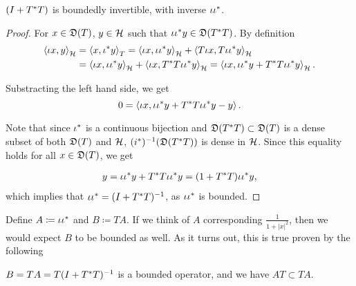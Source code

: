 \begin{prop}
 $(I + T ^{*} T)$ is boundedly
 invertible, with inverse $\iota \iota ^{*}$.
\end{prop}
\begin{proof}
  For $x \in \mathfrak{D}(T)$, $y \in \mathcal{H}$ such that 
  $\iota  \iota ^{*} y \in \mathfrak{D}(T^{*} T)$.
  By definition 
  \begin{align*}
\left\langle \iota x, y \right\rangle_{\mathcal{H}} &= \left\langle x, \iota ^{*} y \right\rangle_T = 
  \left\langle \iota x,\iota \iota ^{*} y \right\rangle_{\mathcal{H}} +
  \left\langle  T \iota x, T \iota \iota ^{*} y \right\rangle_{\mathcal{H}} \\
  &=\left\langle \iota x, \iota \iota ^{*} y \right\rangle_{\mathcal{H}}  +
  \left\langle \iota x , T ^{*} T \iota \iota ^{*} y \right\rangle_{\mathcal{H}}  =
  \left\langle \iota x, \iota \iota ^{*} y + T^{*} T \iota \iota ^{*} y \right\rangle_{\mathcal{H}} .
  \end{align*}
  
  Substracting the left hand side, we get
  \[
   0 = \left\langle \iota x , \iota \iota ^{*} y + T^{*} T \iota \iota ^{*} y - y \right\rangle.
  \]

  
  Note that since $\iota ^{*}$ is a continuous bijection and $\mathfrak{D}(T ^{*} T)
  \subset \mathfrak{D}(T)$ is a
  dense subset of both $\mathfrak{D}(T)$ and $\mathcal{H}$, $(i ^{*}) ^{-1} (\mathfrak{D}(T ^{*} T))$ is dense
  in $\mathcal{H}$. Since this equality holds for all $x \in \mathfrak{D}(T)$, we get

  \begin{align*}
  y=\iota \iota ^{*} y + T^{*} T \iota \iota ^{*} y 
  = (1+ T ^{*} T) \iota \iota ^{*} y,
  \end{align*}
  which implies that $ \iota \iota ^{*} = ( I + T ^{*} T) ^{-1}$,
  as $\iota \iota^{*} $ is bounded.
\end{proof}

Define $A \coloneqq \iota \iota ^{*}$ and $B \coloneqq TA$. 
If we think of $A$ corresponding $\frac{1}{1 + |x|^2}$, then we would expect
$B$ to be bounded as well.
As it turns out, this is true proven by the following

\begin{lem}
 $B = TA = T(I + T ^{*} T)^{-1}$ is a bounded operator, and we have
 $AT \subset TA$.
\end{lem}



